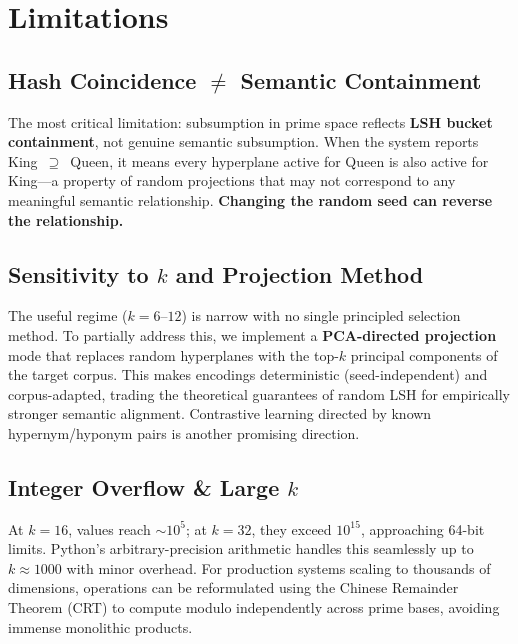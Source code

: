 \documentclass[10pt]{article}
\begin{document}
\section{Limitations}

\subsection{Hash Coincidence $\neq$ Semantic Containment}

The most critical limitation: subsumption in prime space reflects \textbf{LSH bucket containment}, not genuine semantic subsumption. When the system reports King~$\supseteq$~Queen, it means every hyperplane active for Queen is also active for King---a property of random projections that may not correspond to any meaningful semantic relationship. \textbf{Changing the random seed can reverse the relationship.}

\subsection{Sensitivity to $k$ and Projection Method}

The useful regime ($k\!=\!6$--$12$) is narrow with no single principled selection method. To partially address this, we implement a \textbf{PCA-directed projection} mode that replaces random hyperplanes with the top-$k$ principal components of the target corpus. This makes encodings deterministic (seed-independent) and corpus-adapted, trading the theoretical guarantees of random LSH for empirically stronger semantic alignment. Contrastive learning directed by known hypernym/hyponym pairs is another promising direction.

\subsection{Integer Overflow \& Large $k$}

At $k\!=\!16$, values reach $\sim\!10^5$; at $k\!=\!32$, they exceed $10^{15}$, approaching 64-bit limits. Python's arbitrary-precision arithmetic handles this seamlessly up to $k \approx 1000$ with minor overhead. For production systems scaling to thousands of dimensions, operations can be reformulated using the Chinese Remainder Theorem (CRT) to compute modulo independently across prime bases, avoiding immense monolithic products.
\end{document}
